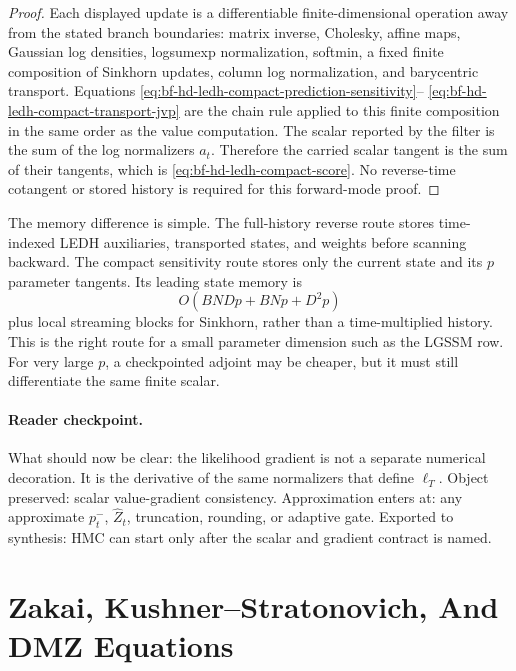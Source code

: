 \begin{proof}
Each displayed update is a differentiable finite-dimensional operation away
from the stated branch boundaries: matrix inverse, Cholesky, affine maps,
Gaussian log densities, logsumexp normalization, softmin, a fixed finite
composition of Sinkhorn updates, column log normalization, and barycentric
transport.  Equations
\eqref{eq:bf-hd-ledh-compact-prediction-sensitivity}--
\eqref{eq:bf-hd-ledh-compact-transport-jvp} are the chain rule applied to this
finite composition in the same order as the value computation.  The scalar
reported by the filter is the sum of the log normalizers \(a_t\).  Therefore
the carried scalar tangent is the sum of their tangents, which is
\eqref{eq:bf-hd-ledh-compact-score}.  No reverse-time cotangent or stored
history is required for this forward-mode proof.
\end{proof}

The memory difference is simple.  The full-history reverse route stores
time-indexed LEDH auxiliaries, transported states, and weights before scanning
backward.  The compact sensitivity route stores only the current state and its
\(p\) parameter tangents.  Its leading state memory is
\[
  O(BNDp+BNp+D^2p)
\]
plus local streaming blocks for Sinkhorn, rather than a time-multiplied
history.  This is the right route for a small parameter dimension such as the
LGSSM row.  For very large \(p\), a checkpointed adjoint may be cheaper, but it
must still differentiate the same finite scalar.

\paragraph{Reader checkpoint.}
What should now be clear: the likelihood gradient is not a separate numerical
decoration.  It is the derivative of the same normalizers that define
\(\ell_T\).  Object preserved: scalar value-gradient consistency.  Approximation
enters at: any approximate \(p_t^-\), \(\widehat Z_t\), truncation, rounding, or
adaptive gate.  Exported to synthesis: HMC can start only after the scalar and
gradient contract is named.

\section{Zakai, Kushner--Stratonovich, And DMZ Equations}
\label{sec:bf-hd-zakai-dmz}

